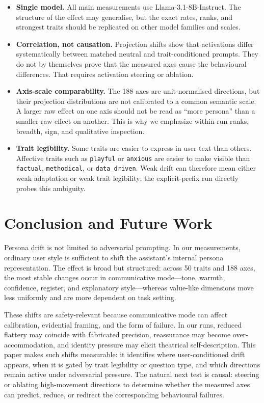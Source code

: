 \documentclass{article}
\newcommand{\ax}[1]{\texttt{#1}}   %
\begin{document}
\begin{itemize}[leftmargin=1.6em, itemsep=2pt]
\item \textbf{Single model.} All main measurements use \mbox{Llama-3.1-8B-Instruct}. The structure of the effect may generalise, but the exact rates, ranks, and strongest traits should be replicated on other model families and scales.
\item \textbf{Correlation, not causation.} Projection shifts show that activations differ systematically between matched neutral and trait-conditioned prompts. They do not by themselves prove that the measured axes cause the behavioural differences. That requires activation steering or ablation.
\item \textbf{Axis-scale comparability.} The 188 axes are unit-normalised directions, but their projection distributions are not calibrated to a common semantic scale. A larger raw effect on one axis should not be read as ``more persona'' than a smaller raw effect on another. This is why we emphasize within-run ranks, breadth, sign, and qualitative inspection.
\item \textbf{Trait legibility.} Some traits are easier to express in user text than others. Affective traits such as \ax{playful} or \ax{anxious} are easier to make visible than \ax{factual}, \ax{methodical}, or \ax{data\_driven}. Weak drift can therefore mean either weak adaptation or weak trait legibility; the explicit-prefix run directly probes this ambiguity.
\end{itemize}

\section{Conclusion and Future Work}
\label{sec:conclusion}

Persona drift is not limited to adversarial prompting. In our measurements, ordinary user style is sufficient to shift the assistant's internal persona representation. The effect is broad but structured: across 50 traits and 188 axes, the most stable changes occur in communicative mode---tone, warmth, confidence, register, and explanatory style---whereas value-like dimensions move less uniformly and are more dependent on task setting.

These shifts are safety-relevant because communicative mode can affect calibration, evidential framing, and the form of failure. In our runs, reduced flattery may coincide with fabricated precision, reassurance may become over-accommodation, and identity pressure may elicit theatrical self-description. This paper makes such shifts measurable: it identifies where user-conditioned drift appears, when it is gated by trait legibility or question type, and which directions remain active under adversarial pressure. The natural next test is causal: steering or ablating high-movement directions to determine whether the measured axes can predict, reduce, or redirect the corresponding behavioural failures.
\end{document}
